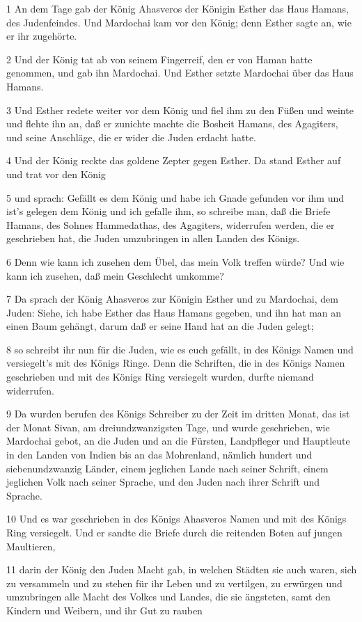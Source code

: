 \par 1 An dem Tage gab der König Ahasveros der Königin Esther das Haus Hamans, des Judenfeindes. Und Mardochai kam vor den König; denn Esther sagte an, wie er ihr zugehörte.
\par 2 Und der König tat ab von seinem Fingerreif, den er von Haman hatte genommen, und gab ihn Mardochai. Und Esther setzte Mardochai über das Haus Hamans.
\par 3 Und Esther redete weiter vor dem König und fiel ihm zu den Füßen und weinte und flehte ihn an, daß er zunichte machte die Bosheit Hamans, des Agagiters, und seine Anschläge, die er wider die Juden erdacht hatte.
\par 4 Und der König reckte das goldene Zepter gegen Esther. Da stand Esther auf und trat vor den König
\par 5 und sprach: Gefällt es dem König und habe ich Gnade gefunden vor ihm und ist's gelegen dem König und ich gefalle ihm, so schreibe man, daß die Briefe Hamans, des Sohnes Hammedathas, des Agagiters, widerrufen werden, die er geschrieben hat, die Juden umzubringen in allen Landen des Königs.
\par 6 Denn wie kann ich zusehen dem Übel, das mein Volk treffen würde? Und wie kann ich zusehen, daß mein Geschlecht umkomme?
\par 7 Da sprach der König Ahasveros zur Königin Esther und zu Mardochai, dem Juden: Siehe, ich habe Esther das Haus Hamans gegeben, und ihn hat man an einen Baum gehängt, darum daß er seine Hand hat an die Juden gelegt;
\par 8 so schreibt ihr nun für die Juden, wie es euch gefällt, in des Königs Namen und versiegelt's mit des Königs Ringe. Denn die Schriften, die in des Königs Namen geschrieben und mit des Königs Ring versiegelt wurden, durfte niemand widerrufen.
\par 9 Da wurden berufen des Königs Schreiber zu der Zeit im dritten Monat, das ist der Monat Sivan, am dreiundzwanzigsten Tage, und wurde geschrieben, wie Mardochai gebot, an die Juden und an die Fürsten, Landpfleger und Hauptleute in den Landen von Indien bis an das Mohrenland, nämlich hundert und siebenundzwanzig Länder, einem jeglichen Lande nach seiner Schrift, einem jeglichen Volk nach seiner Sprache, und den Juden nach ihrer Schrift und Sprache.
\par 10 Und es war geschrieben in des Königs Ahasveros Namen und mit des Königs Ring versiegelt. Und er sandte die Briefe durch die reitenden Boten auf jungen Maultieren,
\par 11 darin der König den Juden Macht gab, in welchen Städten sie auch waren, sich zu versammeln und zu stehen für ihr Leben und zu vertilgen, zu erwürgen und umzubringen alle Macht des Volkes und Landes, die sie ängsteten, samt den Kindern und Weibern, und ihr Gut zu rauben
